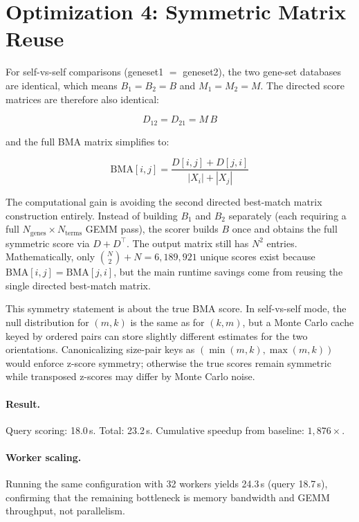 \documentclass[11pt,a4paper]{article}
\begin{document}
\section{Optimization 4: Symmetric Matrix Reuse}

For self-vs-self comparisons (geneset1 $=$ geneset2), the two gene-set
databases are identical, which means $B_1 = B_2 = B$ and $M_1 = M_2 = M$.
The directed score matrices are therefore also identical:

\[
	D_{12} = D_{21} = M\,B
\]

and the full BMA matrix simplifies to:

\[
	\mathrm{BMA}[i,j] = \frac{D[i,j] + D[j,i]}{|X_i| + |X_j|}
\]

The computational gain is avoiding the second directed best-match matrix
construction entirely. Instead of building $B_1$ and $B_2$ separately (each
requiring a full $N_\text{genes} \times N_\text{terms}$ GEMM pass), the
scorer builds $B$ once and obtains the full symmetric score via
$D + D^\top$. The output matrix still has $N^2$ entries. Mathematically,
only $\binom{N}{2} + N = 6{,}189{,}921$ unique scores exist because
$\mathrm{BMA}[i,j] = \mathrm{BMA}[j,i]$, but the main runtime savings come
from reusing the single directed best-match matrix.

This symmetry statement is about the true BMA score. In self-vs-self mode,
the null distribution for $(m,k)$ is the same as for $(k,m)$, but a Monte
Carlo cache keyed by ordered pairs can store slightly different estimates for
the two orientations. Canonicalizing size-pair keys as
$(\min(m,k), \max(m,k))$ would enforce z-score symmetry; otherwise the true
scores remain symmetric while transposed z-scores may differ by Monte Carlo
noise.

\paragraph{Result.}
Query scoring: 18.0\,s. Total: 23.2\,s. Cumulative speedup from
baseline: $1{,}876\times$.

\paragraph{Worker scaling.}
Running the same configuration with 32 workers yields 24.3\,s (query 18.7\,s),
confirming that the remaining bottleneck is memory bandwidth and GEMM
throughput, not parallelism.
\end{document}
